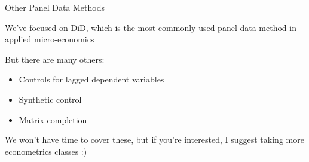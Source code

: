 \documentclass[11pt,english,handout]{beamer}
\newenvironment{wideitemize}{\itemize\addtolength{\itemsep}{10pt}}{\enditemize}
\begin{document}
\begin{frame}{Other Panel Data Methods}
	\begin{wideitemize}
		\item 
		We've focused on DiD, which is the most commonly-used panel data method in applied micro-economics
		
		\item
		But there are many others:
		
		\begin{itemize}
			\item 
			Controls for lagged dependent variables
			
			\item
			Synthetic control
			
			\item
			Matrix completion
		\end{itemize}
	
		\item
		We won't have time to cover these, but if you're interested, I suggest taking more econometrics classes :) 
	\end{wideitemize}
\end{frame}

















	
\end{document}
